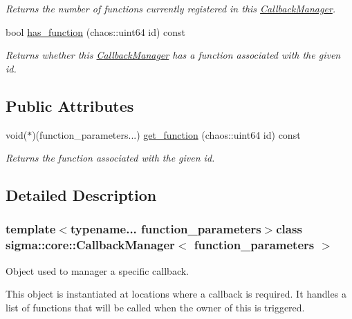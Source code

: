 \begin{DoxyCompactItemize}
\begin{DoxyCompactList}\small\item\em Returns the number of functions currently registered in this \hyperlink{classsigma_1_1core_1_1_callback_manager}{Callback\+Manager}. \end{DoxyCompactList}\item 
\hypertarget{classsigma_1_1core_1_1_callback_manager_ad0d7c7aed410522b26005713268a845e}{}bool \hyperlink{classsigma_1_1core_1_1_callback_manager_ad0d7c7aed410522b26005713268a845e}{has\+\_\+function} (chaos\+::uint64 id) const \label{classsigma_1_1core_1_1_callback_manager_ad0d7c7aed410522b26005713268a845e}

\begin{DoxyCompactList}\small\item\em Returns whether this \hyperlink{classsigma_1_1core_1_1_callback_manager}{Callback\+Manager} has a function associated with the given id. \end{DoxyCompactList}\end{DoxyCompactItemize}
\subsection*{Public Attributes}
\begin{DoxyCompactItemize}
\item 
void($\ast$)(function\+\_\+parameters...) \hyperlink{classsigma_1_1core_1_1_callback_manager_a3c36f3c32e2d6ea0f395f6bdd8775039}{get\+\_\+function} (chaos\+::uint64 id) const
\begin{DoxyCompactList}\small\item\em Returns the function associated with the given id. \end{DoxyCompactList}\end{DoxyCompactItemize}


\subsection{Detailed Description}
\subsubsection*{template$<$typename... function\+\_\+parameters$>$class sigma\+::core\+::\+Callback\+Manager$<$ function\+\_\+parameters $>$}

Object used to manager a specific callback. 

This object is instantiated at locations where a callback is required. It handles a list of functions that will be called when the owner of this is triggered.

